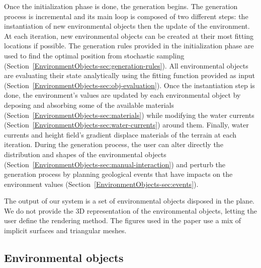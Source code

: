 Once the initialization phase is done, the generation begins. The generation process is incremental and its main loop is composed of two different steps: the instantiation of new environmental objects then the update of the environment.
At each iteration, new environmental objects can be created at their most fitting locations if possible. The generation rules provided in the initialization phase are used to find the optimal position from stochastic sampling (Section~\ref{EnvironmentObjects-sec:generation-rules}). 
All environmental objects are evaluating their state analytically using the fitting function provided as input (Section~\ref{EnvironmentObjects-sec:obj-evaluation}).
Once the instantiation step is done, the environment's values are updated by each environmental object by deposing and absorbing some of the available materials (Section~\ref{EnvironmentObjects-sec:materials}) while modifying the water currents (Section~\ref{EnvironmentObjects-sec:water-currents}) around them. Finally, water currents and height field's gradient displace materials of the terrain at each iteration.
During the generation process, the user can alter directly the distribution and shapes of the environmental objects (Section~\ref{EnvironmentObjects-sec:manual-interaction}) and perturb the generation process by planning geological events that have impacts on the environment values (Section~\ref{EnvironmentObjects-sec:events}).

The output of our system is a set of environmental objects disposed in the plane. We do not provide the 3D representation of the environmental objects, letting the user define the rendering method. The figures used in the paper use a mix of implicit surfaces and triangular meshes.



\subsection{Environmental objects}
\label{EnvironmentObjects-sec:environmental-objects}

